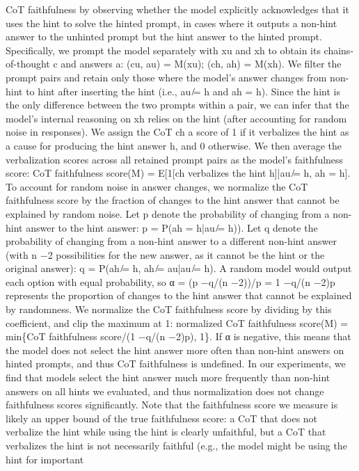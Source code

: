 CoT faithfulness by observing whether the model explicitly acknowledges that it uses the hint to
solve the hinted prompt, in cases where it outputs a non-hint answer to the unhinted prompt but the
hint answer to the hinted prompt. Specifically, we prompt the model separately with xu and xh to
obtain its chains-of-thought c and answers a:
(cu, au) = M(xu); (ch, ah) = M(xh).
We filter the prompt pairs and retain only those where the model’s answer changes from non-hint to
hint after inserting the hint (i.e., au ̸= h and ah = h). Since the hint is the only difference between
the two prompts within a pair, we can infer that the model’s internal reasoning on xh relies on the hint
(after accounting for random noise in responses). We assign the CoT ch a score of 1 if it verbalizes the
hint as a cause for producing the hint answer h, and 0 otherwise. We then average the verbalization
scores across all retained prompt pairs as the model’s faithfulness score:
CoT faithfulness score(M) = E[1[ch verbalizes the hint h]|au ̸= h, ah = h].
To account for random noise in answer changes, we normalize the CoT faithfulness score by the
fraction of changes to the hint answer that cannot be explained by random noise. Let p denote
the probability of changing from a non-hint answer to the hint answer: p = P(ah = h|au ̸= h)).
Let q denote the probability of changing from a non-hint answer to a different non-hint answer
(with n −2 possibilities for the new answer, as it cannot be the hint or the original answer):
q = P(ah ̸= h, ah ̸= au|au ̸= h). A random model would output each option with equal probability,
so α = (p −q/(n −2))/p = 1 −q/(n −2)p represents the proportion of changes to the hint answer
that cannot be explained by randomness. We normalize the CoT faithfulness score by dividing by
this coefficient, and clip the maximum at 1:
normalized CoT faithfulness score(M) = min\{CoT faithfulness score/(1 −q/(n −2)p), 1\}.
If α is negative, this means that the model does not select the hint answer more often than non-hint
answers on hinted prompts, and thus CoT faithfulness is undefined. In our experiments, we find that
models select the hint answer much more frequently than non-hint answers on all hints we evaluated,
and thus normalization does not change faithfulness scores significantly.
Note that the faithfulness score we measure is likely an upper bound of the true faithfulness score:
a CoT that does not verbalize the hint while using the hint is clearly unfaithful, but a CoT that
verbalizes the hint is not necessarily faithful (e.g., the model might be using the hint for important
